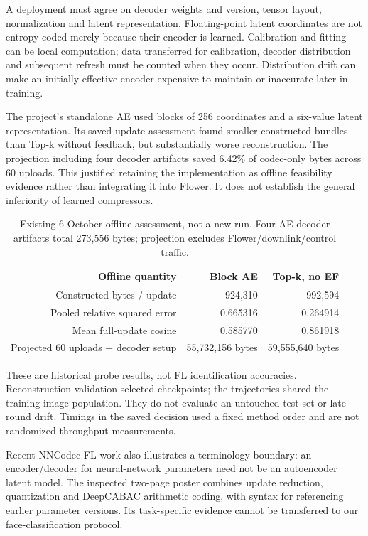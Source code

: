 A deployment must agree on decoder weights and version, tensor layout, normalization and latent representation. Floating-point latent coordinates are not entropy-coded merely because their encoder is learned. Calibration and fitting can be local computation; data transferred for calibration, decoder distribution and subsequent refresh must be counted when they occur. Distribution drift can make an initially effective encoder expensive to maintain or inaccurate later in training.

The project's standalone AE used blocks of 256 coordinates and a six-value latent representation. Its saved-update assessment found smaller constructed bundles than Top-k without feedback, but substantially worse reconstruction. The projection including four decoder artifacts saved 6.42\% of codec-only bytes across 60 uploads. This justified retaining the implementation as offline feasibility evidence rather than integrating it into Flower. It does not establish the general inferiority of learned compressors.

\begin{table}[htbp]
\centering
\small
\begin{tabularx}{\textwidth}{R{1.44000}R{0.78000}R{0.78000}}
\toprule
\textbf{Offline quantity} & \textbf{Block AE} & \textbf{Top-k, no EF} \\\midrule
Constructed bytes / update & 924,310 & 992,594 \\
Pooled relative squared error & 0.665316 & 0.264914 \\
Mean full-update cosine & 0.585770 & 0.861918 \\
Projected 60 uploads + decoder setup & 55,732,156 bytes & 59,555,640 bytes \\
\bottomrule
\end{tabularx}
\caption{Existing 6 October offline assessment, not a new run. Four AE decoder artifacts total 273,556 bytes; projection excludes Flower/downlink/control traffic.}
\label{tab:ae}
\end{table}

These are historical probe results, not FL identification accuracies. Reconstruction validation selected checkpoints; the trajectories shared the training-image population. They do not evaluate an untouched test set or late-round drift. Timings in the saved decision used a fixed method order and are not randomized throughput measurements.

Recent NNCodec FL work also illustrates a terminology boundary: an encoder/decoder for neural-network parameters need not be an autoencoder latent model. The inspected two-page poster combines update reduction, quantization and DeepCABAC arithmetic coding, with syntax for referencing earlier parameter versions. Its task-specific evidence cannot be transferred to our face-classification protocol. \parencite{becking2025tinyfl}


